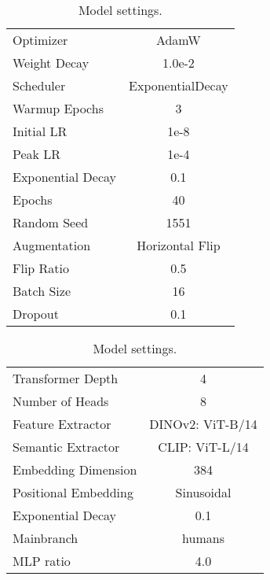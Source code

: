 \documentclass{article}
\begin{document}
\begin{table}[htbp]
    \begin{minipage}[t]{.5\linewidth}
        \raggedright
        \caption{Training settings.}
        \begin{tabular}{l|c}
        \toprule
        Optimizer         & AdamW               \\
        Weight Decay      & 1.0e-2               \\
        Scheduler         & ExponentialDecay \\
        Warmup Epochs     & 3        \\
        Initial LR            & 1e-8          \\
        Peak LR            & 1e-4               \\
        Exponential Decay  & 0.1            \\
        Epochs            & 40            \\
        Random Seed       & 1551                     \\
        Augmentation      & Horizontal Flip           \\
        Flip Ratio & 0.5               \\
        Batch Size        & 16                     \\
        Dropout           & 0.1              \\  \bottomrule      
        \end{tabular}\label{tab:training_settings}
    \end{minipage}\begin{minipage}[t]{.5\linewidth}
            \caption{Model settings.}
            \raggedleft
            \begin{tabular}{l|c}
            \toprule
            Transformer Depth         & 4               \\
            Number of Heads      & 8             \\
            Feature Extractor         & DINOv2: ViT-B/14 \citep{oquab2023dinov2} \\
            Semantic Extractor     & CLIP: ViT-L/14    \citep{clip}    \\
            Embedding Dimension            & 384          \\
            Positional Embedding            & Sinusoidal               \\
            Exponential Decay  & 0.1            \\
            Mainbranch            & humans            \\
            MLP ratio       & 4.0                     \\  \bottomrule      
            \end{tabular}\label{tab:modelsettings}
    \end{minipage}
\end{table}
 
\end{document}
